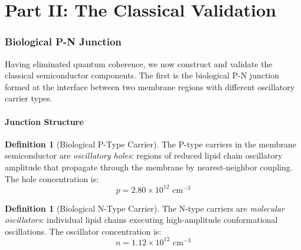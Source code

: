 \documentclass[12pt]{article}
\theoremstyle{definition}
\newtheorem{definition}[theorem]{Definition}
\theoremstyle{remark}
\begin{document}

\part*{Part II: The Classical Validation}

\section{Biological P-N Junction}
\label{sec:pn_junction}

Having eliminated quantum coherence, we now construct and validate the classical semiconductor components. The first is the biological P-N junction formed at the interface between two membrane regions with different oscillatory carrier types.

\subsection{Junction Structure}

\begin{definition}[Biological P-Type Carrier]
\label{def:ptype}
The P-type carriers in the membrane semiconductor are \emph{oscillatory holes}: regions of reduced lipid chain oscillatory amplitude that propagate through the membrane by nearest-neighbor coupling. The hole concentration is:
\begin{equation}
\label{eq:ptype}
p = 2.80 \times 10^{12} \text{ cm}^{-3}
\end{equation}
\end{definition}

\begin{definition}[Biological N-Type Carrier]
\label{def:ntype}
The N-type carriers are \emph{molecular oscillators}: individual lipid chains executing high-amplitude conformational oscillations. The oscillator concentration is:
\begin{equation}
\label{eq:ntype}
n = 1.12 \times 10^{12} \text{ cm}^{-3}
\end{equation}
\end{definition}
\end{document}
